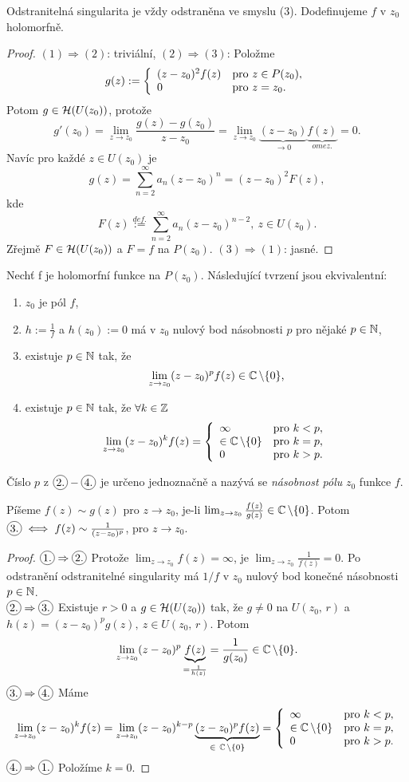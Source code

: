 \begin{agreement}
Odstranitelná singularita je vždy odstraněna ve smyslu (3). Dodefinujeme $f$ v $z_0$ holomorfně.
\end{agreement}
\begin{proof}
$(1)\Rightarrow(2)$: triviální, $(2)\Rightarrow(3)$: Položme 
$$g(z):=\left\{ \begin{array}{ll} (z-z_0)^2f(z) & \mbox{pro } z\in P(z_0), \\ 0 & \mbox{pro } z=z_0. \end{array} \right.$$ 
Potom $g\in \operatorname{\mathcal{H}}(U(z_0))$, protože 
$$g'(z_0)=\lim_{z\rightarrow z_0}\frac{g(z)-g(z_0)}{z-z_0}=\lim_{z\rightarrow z_0}\underbrace{(z-z_0)}_{\rightarrow0}\underbrace{f(z)}_{omez.}=0.$$
Navíc pro každé $z\in U(z_0)$ je 
$$g(z)=\sum_{n=2}^{\infty}a_n(z-z_0)^n=(z-z_0)^2F(z),$$ kde $$F(z)\stackrel{def.}{:=}\sum_{n=2}^{\infty}a_n(z-z_0)^{n-2},\ z\in U(z_0).$$ Zřejmě $F\in\operatorname{\mathcal{H}}(U(z_0))$ a $F=f$ na $P(z_0).$
$(3)\Rightarrow(1)$: jasné.
\end{proof}
\begin{theorem}[O pólu] Nechť f je holomorfní funkce na $P(z_0)$. Následující tvrzení jsou ekvivalentní:
\begin{enumerate}
    \item $z_0$ je pól $f$,
    \item $h:=\frac{1}{f}$ a $h(z_0):=0$ má v $z_0$ nulový bod násobnosti $p$ pro nějaké $p\in\operatorname{\mathbb{N}}$,
    \item existuje $p\in\operatorname{\mathbb{N}}$ tak, že $$\lim_{z\rightarrow z_0}(z-z_0)^pf(z)\in\operatorname{\mathbb{C}}\setminus\{0\}\text{,}$$
    \item existuje $p\in \operatorname{\mathbb{N}}$ tak, že $\forall k\in\operatorname{\mathbb{Z}}$ $$\lim_{z\rightarrow z_0}(z-z_0)^kf(z)=\left\{ \begin{array}{lll} \infty & \mbox{pro } k<p, \\ \in\operatorname{\mathbb{C}}\setminus\{0\} & \mbox{pro } k=p, \\ 0 & \mbox{pro } k>p. \end{array} \right.$$
\end{enumerate}
Číslo $p$ z $\circled{2.} - \circled{4.}$ je určeno jednoznačně a nazývá se \emph{násobnost pólu} $z_0$ funkce $f$.
\end{theorem}

\begin{note}
Píšeme $f(z)\sim g(z)$ pro $z\rightarrow z_0$, je-li $\lim_{z\rightarrow z_0}\frac{f(z)}{g(z)}\in\operatorname{\mathbb{C}}\setminus\{0\}$. Potom $\circled{3.}\iff f(z)\sim\frac{1}{(z-z_0)^p}$, pro $z\rightarrow z_0$.
\end{note} 

\begin{proof}
$\circled{1.}\Rightarrow\circled{2.}$ Protože $\lim_{z\rightarrow z_0}f(z)=\infty$, je $\lim_{z\rightarrow z_0}\frac{1}{f(z)}=0$. Po odstranění odstranitelné singularity má $1/f$ v $z_0$ nulový bod konečné násobnosti $p\in\operatorname{\mathbb{N}}$.\\
$\circled{2.}\Rightarrow\circled{3.}$ Existuje $r>0$ a $g\in\operatorname{\mathcal{H}}(U(z_0))$ tak, že $g\neq 0$ na $U(z_0,\,r)$ a $h(z)=(z-z_0)^p g(z),\ z\in U(z_0,\,r)$. Potom 
$$\lim_{z\rightarrow z_0}(z-z_0)^p\underbrace{f(z)}_{=\frac{1}{h(z)}}=\frac{1}{g(z_0)}\in\operatorname{\mathbb{C}}\setminus\{0\}.$$
$\circled{3.}\Rightarrow\circled{4.}$ Máme 
$$\lim_{z\rightarrow z_0}(z-z_0)^kf(z)=\lim_{z\rightarrow z_0}(z-z_0)^{k-p}\underbrace{(z-z_0)^pf(z)}_{\in\ \Comp\setminus\{0\}}=\threepartdef{\infty}{k<p,}{\in\Comp\setminus\{0\}}{k=p,}{0}{k>p.}$$
$\circled{4.}\Rightarrow\circled{1.}$ Položíme $k=0$.
\end{proof}

